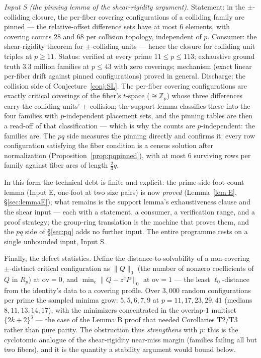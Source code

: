 \documentclass[11pt,a4paper]{article}
\numberwithin{equation}{section}
\theoremstyle{plain}
\theoremstyle{plain}
\theoremstyle{definition}
\theoremstyle{remark}
\newcommand{\Z}{\mathbb{Z}}
\begin{document}
\emph{Input S (the pinning lemma of the shear-rigidity argument).}
Statement: in the $\pm$-colliding closure, the per-fiber covering
configurations of a colliding family are pinned --- the relative-offset
difference sets have at most $6$ elements, with covering counts $28$ and
$68$ per collision topology, independent of $p$. Consumer: the
shear-rigidity theorem for $\pm$-colliding units --- hence the closure for
colliding unit triples at $p\ge11$. Status: verified at every prime
$11\le p\le113$; exhaustive ground truth $3.3$ million families at $p\le43$
with zero coverings; mechanism (exact linear per-fiber drift against
pinned configurations) proved in general. Discharge: the collision side of
Conjecture~\ref{conj:SL}. The per-fiber covering configurations are exactly
critical coverings of the fiber's $t$-space ($\cong\Z_p$) whose three
differences carry the colliding units' $\pm$-collision; the support lemma
classifies these into the four families with $p$-independent placement
sets, and the pinning tables are then a read-off of that classification ---
which is why the counts are $p$-independent: the families are. The $pq$
side measures the pinning directly and confirms it: every row configuration
satisfying the fiber condition is a census solution after normalization
(Proposition~\ref{prop:pqpinned}), with at most $6$ surviving rows per
family against fiber arcs of length $\tfrac23 q$.

In this form the technical debt is finite and explicit: the prime-side
foot-count lemma (Input E, one-foot at two size pairs) is now \emph{proved}
(Lemma~\ref{lem:E}, \S\ref{sec:lemmaE}); what remains is the support
lemma's exhaustiveness clause and the shear input --- each with a
statement, a consumer, a verification range, and a proof strategy; the
group-ring translation is the machine that proves them, and the $pq$ side
of \S\ref{sec:pq} adds no further input. The entire
programme rests on a single unbounded input, Input S.

\medskip
Finally, the defect statistics. Define the distance-to-solvability of a
non-covering $\pm$-distinct critical configuration as $\|Q\|_{0}$ (the
number of nonzero coefficients of $Q$ in $R_p$) at $\mathrm{ov}=0$, and
$\min_e\|Q-z^eP\|_{0}$ at $\mathrm{ov}=1$ --- the least $\ell_0$-distance
from the identity's data to a covering profile. Over $3{,}000$ random
configurations per prime the sampled minima grow: $5,5,6,7,9$ at
$p=11,17,23,29,41$ (medians $8,11,13,14,17$), with the minimizers
concentrated in the overlap-$1$ multiset $\{2k{+}2\}^3$ --- the case of the
Lemma B proof that needed Corollaries T2/T3 rather than pure parity. The
obstruction thus \emph{strengthens} with $p$: this is the cyclotomic
analogue of the shear-rigidity near-miss margin (families failing all but
two fibers), and it is the quantity a stability argument would bound below.
\end{document}
